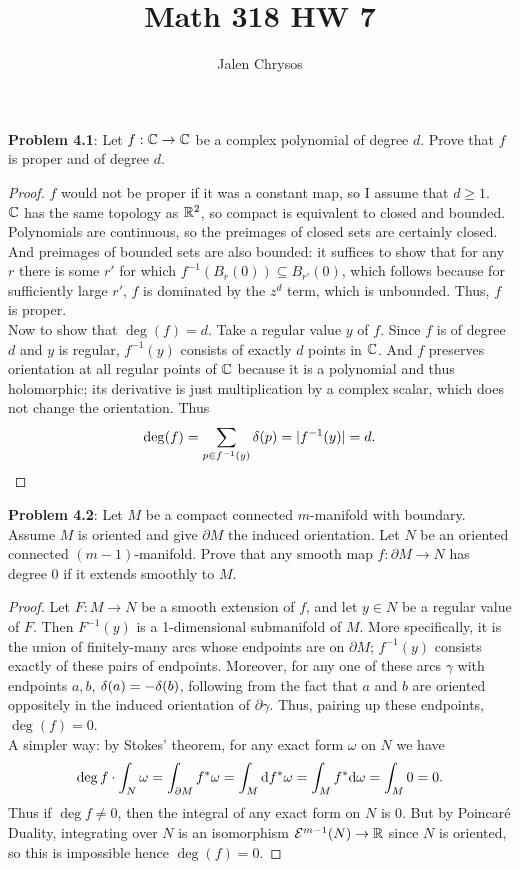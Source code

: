 \documentclass{amsart}
\title{Math 318 HW 7}
\author{Jalen Chrysos}
\begin{document}
	
	\textbf{Problem 4.1}: Let $f:\mathbb{C}\to \mathbb{C}$ be a complex polynomial of degree $d$. Prove that $f$ is proper and of degree $d$.
	\begin{proof}
		$f$ would not be proper if it was a constant map, so I assume that $d\geq 1$.\\
		
		$\mathbb{C}$ has the same topology as $\mathbb{R}^2$, so compact is equivalent to closed and bounded. Polynomials are continuous, so the preimages of closed sets are certainly closed. And preimages of bounded sets are also bounded: it suffices to show that for any $r$ there is some $r'$ for which $f^{-1}(B_{r}(0))\subseteq B_{r'}(0)$, which follows because for sufficiently large $r'$, $f$ is dominated by the $z^d$ term, which is unbounded. Thus, $f$ is proper.\\
		
		Now to show that $\deg(f)=d$. Take a regular value $y$ of $f$. Since $f$ is of degree $d$ and $y$ is regular, $f^{-1}(y)$ consists of exactly $d$ points in $\mathbb{C}$. And $f$ preserves orientation at all regular points of $\mathbb{C}$ because it is a polynomial and thus holomorphic; its derivative is just multiplication by a complex scalar, which does not change the orientation. Thus 
		$$
		\deg(f) = \sum_{p\in f^{-1}(y)} \delta(p) = |f^{-1}(y)| = d.
		$$
	\end{proof}
	
	\newpage
	\textbf{Problem 4.2}: Let $M$ be a compact connected $m$-manifold with boundary. Assume $M$ is oriented and give $\partial M$ the induced orientation. Let $N$ be an oriented connected $(m-1)$-manifold. Prove that any smooth map $f:\partial M\to N$ has degree 0 if it extends smoothly to $M$.
	
	\begin{proof}
		Let $F: M\to N$ be a smooth extension of $f$, and let $y\in N$ be a regular value of $F$. Then $F^{-1}(y)$ is a 1-dimensional submanifold of $M$. More specifically, it is the union of finitely-many arcs whose endpoints are on $\partial M$; $f^{-1}(y)$ consists exactly of these pairs of endpoints. Moreover, for any one of these arcs $\gamma$ with endpoints $a,b$, $\delta(a)=-\delta(b)$, following from the fact that $a$ and $b$ are oriented oppositely in the induced orientation of $\partial \gamma$. Thus, pairing up these endpoints, $\deg(f)=0$.\\
		
		A simpler way: by Stokes' theorem, for any exact form $\omega$ on $N$ we have
		$$
		\deg f \cdot \int_N\omega = \int_{\partial M}f^*\omega = \int_M \textrm{d} f^*\omega = \int_M f^*\textrm{d} \omega = \int_M 0 = 0.
		$$
		Thus if $\deg f \neq 0$, then the integral of any exact form on $N$ is 0. But by Poincar\'e Duality, integrating over $N$ is an isomorphism $\mathcal{E}^{m-1}(N)\to \mathbb{R}$ since $N$ is oriented, so this is impossible hence $\deg(f)=0$.
	\end{proof}
	
\end{document}
